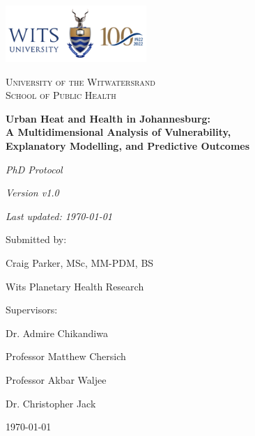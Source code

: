\documentclass[12pt,a4paper]{article}
\newcommand{\protocolversion}{v1.0} %
\newcommand{\revisiondate}{\today} %
\begin{document}
\pagestyle{empty}

\begin{titlepage}
    \thispagestyle{empty} %
    \centering
    \includegraphics[width=0.4\textwidth]{wits_logo.png}\\[1cm]
    
    {\scshape\LARGE University of the Witwatersrand \\
    School of Public Health \par}
    \vspace{1.5cm}
    
    {\huge\bfseries Urban Heat and Health in Johannesburg:\\
    A Multidimensional Analysis of Vulnerability, \\
    Explanatory Modelling, and Predictive Outcomes\par}
    \vspace{1.5cm}
    
    {\large\textit{PhD Protocol}\par}
    \vspace{0.5cm}
    
    {\normalsize\textit{Version \protocolversion}\par} %
    {\normalsize\textit{Last updated: \revisiondate}\par} %
    \vspace{0.5cm}
    
    {\large Submitted by:\par}
    {\Large Craig Parker, MSc, MM-PDM, BS\par}
    {\large Wits Planetary Health Research\par}
    \vspace{0.5cm}
    
    {\large Supervisors:\par}
    {\large Dr. Admire Chikandiwa\par}
    {\large Professor Matthew Chersich\par}
    {\large Professor Akbar Waljee\par}
    {\large Dr. Christopher Jack\par}
    \vfill
    
    {\large \today\par}
\end{titlepage}
\end{document}
